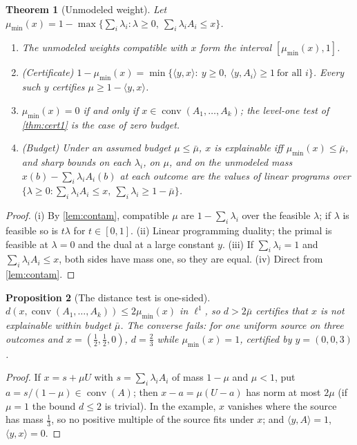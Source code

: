 \documentclass[11pt]{article}
\newtheorem{theorem}{Theorem}[section]
\newtheorem{proposition}[theorem]{Proposition}
\theoremstyle{definition}
\theoremstyle{remark}
\begin{document}
\begin{theorem}[Unmodeled weight]\label{thm:unmodeled}
Let $\mu_{\min}(x)=1-\max\{\sum_i\lambda_i:\lambda\ge0,\ \sum_i\lambda_iA_i\le x\}$.
\begin{enumerate}[label=(\roman*)]
\item The unmodeled weights compatible with $x$ form the interval $[\mu_{\min}(x),1]$.
\item (Certificate) $1-\mu_{\min}(x)=\min\{\langle y,x\rangle:\ y\ge0,\ \langle y,A_i\rangle\ge1\ \text{for
  all }i\}$. Every such $y$ certifies $\mu\ge1-\langle y,x\rangle$.
\item $\mu_{\min}(x)=0$ if and only if $x\in\operatorname{conv}(A_1,\dots,A_k)$; the level-one test of
  \cref{thm:cert1} is the case of zero budget.
\item (Budget) Under an assumed budget $\mu\le\bar\mu$, $x$ is explainable iff $\mu_{\min}(x)\le\bar\mu$,
  and sharp bounds on each $\lambda_i$, on $\mu$, and on the unmodeled mass
  $x(b)-\sum_i\lambda_iA_i(b)$ at each outcome are the values of linear programs over
  $\{\lambda\ge0:\sum_i\lambda_iA_i\le x,\ \sum_i\lambda_i\ge1-\bar\mu\}$.
\end{enumerate}
\end{theorem}
\begin{proof}
(i) By \cref{lem:contam}, compatible $\mu$ are $1-\sum_i\lambda_i$ over the feasible $\lambda$; if $\lambda$
is feasible so is $t\lambda$ for $t\in[0,1]$. (ii) Linear programming duality; the primal is feasible at
$\lambda=0$ and the dual at a large constant $y$. (iii) If $\sum_i\lambda_i=1$ and
$\sum_i\lambda_iA_i\le x$, both sides have mass one, so they are equal. (iv) Direct from
\cref{lem:contam}.
\end{proof}

\begin{proposition}[The distance test is one-sided]\label{prop:dist-onesided}
$d(x,\operatorname{conv}(A_1,\dots,A_k))\le2\mu_{\min}(x)$ in $\ell^1$, so $d>2\bar\mu$ certifies that
$x$ is not explainable within budget $\bar\mu$. The converse fails: for one uniform source on three
outcomes and $x=(\tfrac12,\tfrac12,0)$, $d=\tfrac23$ while $\mu_{\min}(x)=1$, certified by $y=(0,0,3)$.
\end{proposition}
\begin{proof}
If $x=s+\mu U$ with $s=\sum_i\lambda_iA_i$ of mass $1-\mu$ and $\mu<1$, put $a=s/(1-\mu)\in
\operatorname{conv}(A)$; then $x-a=\mu(U-a)$ has norm at most $2\mu$ (if $\mu=1$ the bound $d\le2$ is
trivial). In the example, $x$ vanishes where the source has mass $\tfrac13$, so no positive multiple of
the source fits under $x$; and $\langle y,A\rangle=1$, $\langle y,x\rangle=0$.
\end{proof}
\end{document}
